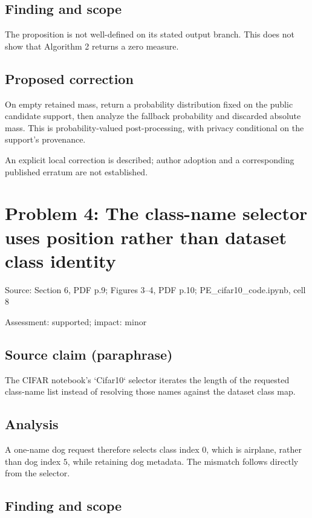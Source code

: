 \documentclass[11pt]{article}
\begin{document}
\subsection*{Finding and scope}

The proposition is not well-defined on its stated output branch. This does not show that Algorithm 2 returns a zero measure.

\subsection*{Proposed correction}

On empty retained mass, return a probability distribution fixed on the public candidate support, then analyze the fallback probability and discarded absolute mass. This is probability-valued post-processing, with privacy conditional on the support’s provenance.

An explicit local correction is described; author adoption and a corresponding published erratum are not established.

\section*{Problem 4: The class-name selector uses position rather than dataset class identity}

Source: Section 6, PDF p.9; Figures 3–4, PDF p.10; PE\_cifar10\_code.ipynb, cell 8

Assessment: supported; impact: minor

\subsection*{Source claim (paraphrase)}

The CIFAR notebook’s `Cifar10` selector iterates the length of the requested class-name list instead of resolving those names against the dataset class map.

\subsection*{Analysis}

A one-name dog request therefore selects class index \(0\), which is airplane, rather than dog index \(5\), while retaining dog metadata. The mismatch follows directly from the selector.

\subsection*{Finding and scope}
\end{document}
